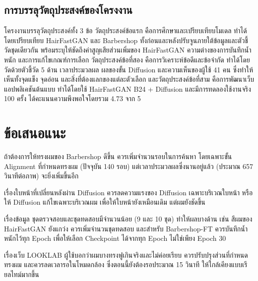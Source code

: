 \subsection{การบรรลุวัตถุประสงค์ของโครงงาน}

โครงงานบรรลุวัตถุประสงค์ทั้ง 3 ข้อ
วัตถุประสงค์ข้อแรก คือการศึกษาและเปรียบเทียบโมเดล ทำได้โดยเปรียบเทียบ HairFastGAN และ Barbershop
ทั้งก่อนและหลังปรับจูนภายใต้ข้อมูลและตัวชี้วัดชุดเดียวกัน
พร้อมระบุให้ชัดถึงค่าสูญเสียส่วนเพิ่มของ HairFastGAN ความต่างของการบันทึกน้ำหนัก และการแก้ไขเกณฑ์การเลือก
วัตถุประสงค์ข้อที่สอง คือการวิเคราะห์ข้อดีและข้อจำกัด ทำได้โดยวัดด้วยตัวชี้วัด 5 ด้าน เวลาประมวลผล
ผลของขั้น Diffusion และความเห็นของผู้ใช้ 41 คน ซึ่งทำให้เห็นทั้งจุดแข็ง จุดอ่อน และสิ่งที่ต้องแลกของแต่ละตัวเลือก
และวัตถุประสงค์ข้อที่สาม คือการพัฒนาเว็บแอปพลิเคชันต้นแบบ ทำได้โดยใช้ HairFastGAN B24 + Diffusion
และมีการทดลองใช้งานจริง 100 ครั้ง ได้คะแนนความพึงพอใจโดยรวม 4.73 จาก 5

\section{ข้อเสนอแนะ}

ถ้าต้องการให้ทรงผมของ Barbershop ดีขึ้น ควรเพิ่มจำนวนรอบในการค้นหา โดยเฉพาะขั้น Alignment ที่กำหนดทรงผม (ปัจจุบัน 140 รอบ)
แต่เวลาประมวลผลซึ่งนานอยู่แล้ว (ประมาณ 657 วินาทีต่อภาพ) จะยิ่งเพิ่มขึ้นอีก

เรื่องใบหน้าที่เปลี่ยนหลังผ่าน Diffusion ควรลดความแรงของ Diffusion เฉพาะบริเวณใบหน้า
หรือให้ Diffusion แก้ไขเฉพาะบริเวณผม เพื่อให้ใบหน้ายังเหมือนเดิม แต่ผมยังชัดขึ้น

เรื่องข้อมูล ชุดตรวจสอบและชุดทดสอบมีจำนวนน้อย (9 และ 10 ชุด) ทำให้ผลบางด้าน เช่น สีผมของ HairFastGAN ยังแกว่ง
ควรเพิ่มจำนวนชุดทดสอบ และสำหรับ Barbershop-FT ควรบันทึกน้ำหนักไว้ทุก Epoch
เพื่อให้เลือก Checkpoint ได้จากทุก Epoch ไม่ใช่เพียง Epoch 30

เรื่องเว็บ LOOKLAB ผู้ใช้บอกว่าผมบางทรงฟูเกินจริงและไม่ค่อยเรียบ ควรปรับปรุงส่วนที่กำหนดทรงผม
และควรลดเวลารอในโหมดกล้อง ซึ่งตอนนี้ยังต้องรอประมาณ 15 วินาที ให้ใกล้เคียงแบบเรียลไทม์มากขึ้น
